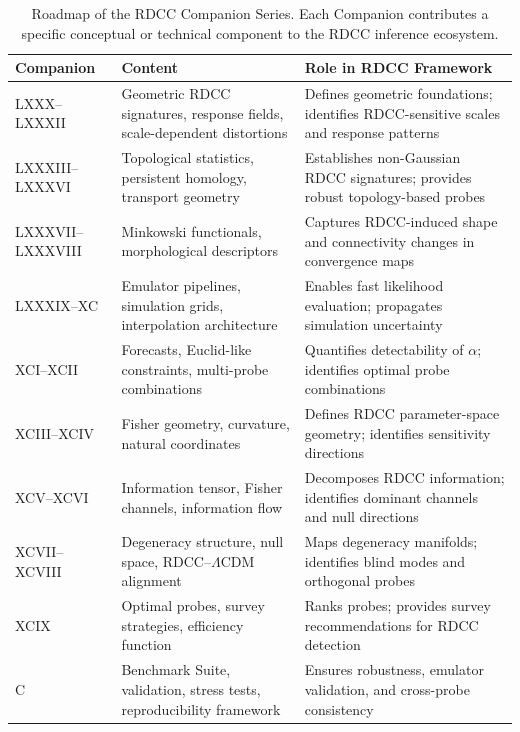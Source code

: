 \documentclass[11pt,a4paper]{article}
\begin{document}
\begin{table}[t]
\centering
\renewcommand{\arraystretch}{1.25}
\begin{tabular}{p{2.2cm} p{6.2cm} p{6.2cm}}
\hline
\textbf{Companion} & \textbf{Content} & \textbf{Role in RDCC Framework} \\
\hline

LXXX--LXXXII &
Geometric RDCC signatures, response fields, scale-dependent distortions &
Defines geometric foundations; identifies RDCC-sensitive scales and response patterns \\

LXXXIII--LXXXVI &
Topological statistics, persistent homology, transport geometry &
Establishes non-Gaussian RDCC signatures; provides robust topology-based probes \\

LXXXVII--LXXXVIII &
Minkowski functionals, morphological descriptors &
Captures RDCC-induced shape and connectivity changes in convergence maps \\

LXXXIX--XC &
Emulator pipelines, simulation grids, interpolation architecture &
Enables fast likelihood evaluation; propagates simulation uncertainty \\

XCI--XCII &
Forecasts, Euclid-like constraints, multi-probe combinations &
Quantifies detectability of $\alpha$; identifies optimal probe combinations \\

XCIII--XCIV &
Fisher geometry, curvature, natural coordinates &
Defines RDCC parameter-space geometry; identifies sensitivity directions \\

XCV--XCVI &
Information tensor, Fisher channels, information flow &
Decomposes RDCC information; identifies dominant channels and null directions \\

XCVII--XCVIII &
Degeneracy structure, null space, RDCC--$\Lambda$CDM alignment &
Maps degeneracy manifolds; identifies blind modes and orthogonal probes \\

XCIX &
Optimal probes, survey strategies, efficiency function &
Ranks probes; provides survey recommendations for RDCC detection \\

C &
Benchmark Suite, validation, stress tests, reproducibility framework &
Ensures robustness, emulator validation, and cross-probe consistency \\
\hline
\end{tabular}
\caption{Roadmap of the RDCC Companion Series. Each Companion contributes a 
specific conceptual or technical component to the RDCC inference ecosystem.}
\end{table}
\end{document}
